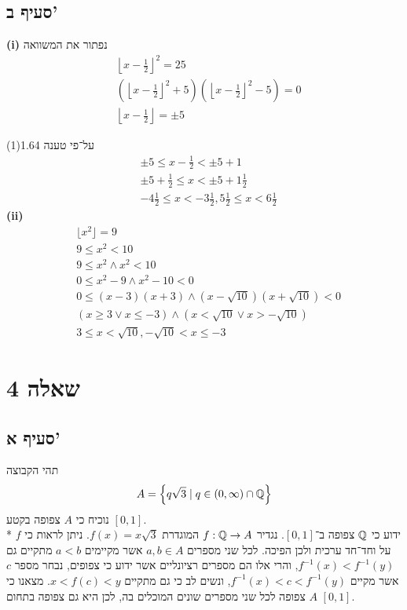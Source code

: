 \subsection{סעיף ב'}
\textbf{(i)}
נפתור את המשוואה
\begin{align*}
	& \left\lfloor x - \frac{1}{2} \right\rfloor^2 = 25 \\
	& \left(\left\lfloor x - \frac{1}{2} \right\rfloor^2 + 5\right)\left(\left\lfloor x - \frac{1}{2} \right\rfloor^2 - 5\right) = 0 \\
	& \left\lfloor x - \frac{1}{2} \right\rfloor = \pm 5
\end{align*}

על־פי טענה 1.64(1)
\begin{align*}
	& \pm 5 \le x - \frac{1}{2} < \pm 5 + 1 \\
	& \pm 5 + \frac{1}{2} \le x < \pm 5 + 1\frac{1}{2}  \\
	& -4 \frac{1}{2} \le x < -3\frac{1}{2}, 5\frac{1}{2} \le x < 6\frac{1}{2}
\end{align*}
\textbf{(ii)}
\begin{align*}
	& \lfloor x^2 \rfloor = 9 \\
	& 9 \le x^2 < 10 \\
	& 9 \le x^2 \land x^2 < 10 \\
	& 0 \le x^2 - 9 \land x^2 - 10 < 0 \\
	& 0 \le (x - 3)(x + 3) \land (x - \sqrt{10})(x + \sqrt{10}) < 0 \\
	& (x \ge 3 \lor x \le -3) \land (x < \sqrt{10} \lor x > -\sqrt{10}) \\
	& 3 \le x < \sqrt{10}, -\sqrt{10} < x \le -3
\end{align*}

\section{שאלה 4}
\subsection{סעיף א'}
תהי הקבוצה
\[
	A = \left\{ q \sqrt{3} \mid q \in (0, \infty) \cap \mathbb{Q} \right\}
\]
נוכיח כי $A$ צפופה בקטע $[0, 1]$. \\*
ידוע כי $\mathbb{Q}$ צפופה ב־$[0, 1]$.
נגדיר $f : \mathbb{Q} \to A$ המוגדרת $f(x) = x \sqrt{3}$. ניתן לראות כי $f$ על וחד־חד ערכית ולכן הפיכה.
לכל שני מספרים $a, b \in A$ אשר מקיימים $a < b$ מתקיים גם $f^{-1}(x) < f^{-1}(y)$, והרי אלו הם מספרים רציונליים אשר ידוע כי צפופים,
נבחר מספר $c$ אשר מקיים $f^{-1}(x) < c < f^{-1}(y)$, ונשים לב כי גם מתקיים $x < f(c) < y$.
מצאנו כי $A$ צפופה לכל שני מספרים שונים המוכלים בה, לכן היא גם צפופה בתחום $[0, 1]$.

